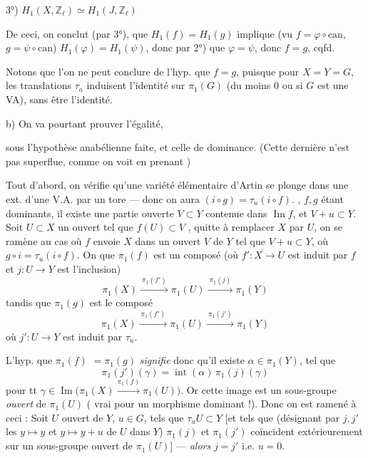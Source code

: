 \documentclass[11pt,a4paper]{article}
\begin{document}
3°) $H_1(X, \mathbb{Z}_\ell) \simeq H_1(J, \mathbb{Z}_\ell)$

De ceci, \struck{\ill{}} on conclut (par 3°), que $H_1(f) = H_1(g)$ implique (vu $f = \varphi \circ \mathrm{can}$, $g = \psi \circ \mathrm{can}$) $H_1(\varphi) = H_1(\psi)$, donc par 2°) que $\varphi = \psi$, donc $f = g$, cqfd.

 Notons que l'on ne peut conclure de l'hyp.  que $f = g$, puisque pour $X = Y = G$, les translations $\tau_a$ induisent l'identité sur $\pi_1(G)$ (du moins \struck{\ill{}}  $0$ ou si $G$ est une VA), sans être l'identité.

b) On va pourtant prouver l'égalité,

sous l'hypothèse anabélienne faite, et celle de dominance. (Cette dernière n'est pas superflue, comme on voit en prenant  )

Tout d'abord, on vérifie qu'une variété élémentaire d'Artin se plonge   dans une ext. d'une V.A. par un tore — donc on aura $(i \circ g) = \tau_u (i \circ f)$.  ,  $f, g$ étant dominants, il existe une partie ouverte  $V \subset Y$ contenue dans $\operatorname{Im} f$, et \ill{} $V + u \subset Y$. Soit $U \subset X$ un ouvert  tel que $f(U) \subset V$ ,  quitte à remplacer $X$ par $U$, on \ill{} se ramène au cas où $f$  envoie $X$ dans un ouvert $V$ de $Y$ tel que $V + u \subset Y$, où $g \circ i = \tau_u (i \circ f)$. On \struck{\ill{}}  que $\pi_1(f)$ est un composé (où $f' : X \to U$ est induit par $f$ et $j : U \to Y$ est l'inclusion)
\[
\pi_1(X) \xrightarrow{\ \pi_1(f')\ } \pi_1(U) \xrightarrow{\ \pi_1(j)\ } \pi_1(Y)
\]
tandis que $\pi_1(g)$ est le composé
\[
\pi_1(X) \xrightarrow{\ \pi_1(f')\ } \pi_1(U) \xrightarrow{\ \pi_1(j')\ } \pi_1(Y)
\]
où $j' : U \to Y$ est induit par $\tau_u$.


L'hyp. que $\pi_1(f)$  $= \pi_1(g)$ \emph{signifie} donc qu'il existe $\alpha \in \pi_1(Y)$, tel que
\[
\pi_1(j')(\gamma) = \operatorname{int}(\alpha)\, \pi_1(j)(\gamma)
\]
pour tt $\gamma \in \operatorname{Im}\bigl(\pi_1(X) \xrightarrow{\pi_1(f)} \pi_1(U)\bigr)$. Or cette image est un sous-groupe \emph{ouvert} de $\pi_1(U)$ ( vrai pour un morphisme dominant !).  Donc on est ramené à ceci : Soit $U$ ouvert \add{$\neq \emptyset$} de $Y$, $u \in G$, tels que $\tau_u U \subset Y$ [et tels que (désignant par $j, j'$ les   $y \mapsto y$ et $y \mapsto y + u$ de $U$ dans $Y$) $\pi_1(j)$ et $\pi_1(j')$ coïncident extérieurement sur un sous-groupe ouvert de $\pi_1(U)$] — \emph{alors} $j = j'$ i.e. $u = 0$.
\end{document}
